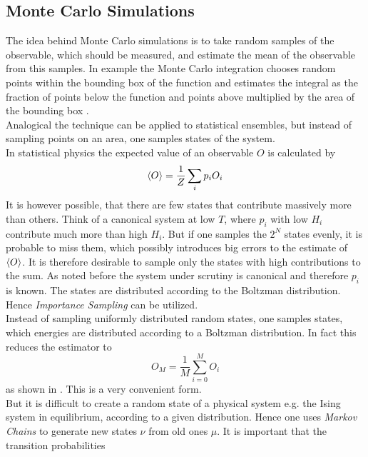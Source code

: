 \subsection{Monte Carlo Simulations}
\label{ssec:montecarlo}
    The idea behind Monte Carlo simulations is to take random samples of
    the observable, which should be measured, and estimate the mean of the observable from
    this samples. In example the Monte Carlo integration chooses random
    points within the bounding box of the function and estimates the integral
    as the fraction of points below the function and points above multiplied
    by the area of the bounding box \cite{Katzgraber2011}.\\
    Analogical the technique can be applied to statistical ensembles,
    but instead of sampling points on an area, one samples states of the
    system.\\
    In statistical physics the expected value of an observable \(O\)
    is calculated by
    \begin{equation}
        \left< O \right> = \frac{1}{Z} \sum_i p_i O_i
    \end{equation}
    It is however possible, that there are few states that contribute
    massively more than others. Think of a canonical system at low \(T\),
    where \(p_i\) with low \(H_i\) contribute much more than high \(H_i\).
    But if one samples the \(2^N\) states evenly, it is probable to miss
    them, which possibly introduces big errors to the estimate of \(\left< O \right>\).
    It is therefore desirable to sample only the states with high
    contributions to the sum.
    As noted before the system under scrutiny is canonical and therefore
    \(p_i\) is known. The states are distributed according to the Boltzman
    distribution. Hence \emph{Importance Sampling} can be utilized.\\
    Instead of sampling uniformly distributed random states, one samples
    states, which energies are distributed according to a Boltzman distribution.
    In fact this reduces the estimator to
    \begin{equation}
        O_M = \frac{1}{M} \sum_{i=0}^M O_i
    \end{equation}
    as shown in \cite{NewmanBarkema1999}. This is a very convenient form.\\
    But it is difficult to create a random state of a physical system e.g. the
    Ising system in equilibrium, according to a given distribution.
    Hence one uses \emph{Markov Chains} to generate new states \(\nu\)
    from old ones \(\mu\). It is important that the transition probabilities
